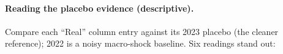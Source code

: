 \documentclass[11pt,a4paper]{article}
\begin{document}
\begin{table}[H]
\centering\scriptsize
\caption{\textbf{MTU15-DA pairwise PC1 coefficient, real vs placebos.} Critical hours only. Both real-year windows are post-blackout (i.e., reforzada is active in pre and post); placebo years are pre-blackout so reforzada is absent in their pre/post windows.}
\label{tab:fpca_placebo_da15}
\setlength{\tabcolsep}{4pt}

\end{table}

\paragraph{Reading the placebo evidence (descriptive).} Compare each ``Real'' column entry against its 2023 placebo (the cleaner reference); 2022 is a noisy macro-shock baseline. Six readings stand out:
\end{document}
